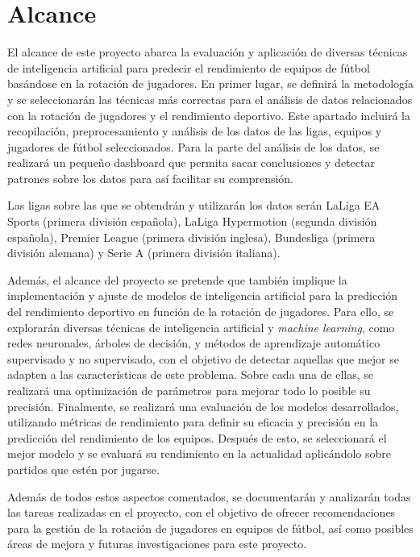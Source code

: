 \section{Alcance}
El alcance de este proyecto abarca la evaluación y aplicación de diversas técnicas de inteligencia artificial para predecir el rendimiento de equipos de fútbol basándose en la rotación de jugadores. En primer lugar, se definirá la metodología y se seleccionarán las técnicas más correctas para el análisis de datos relacionados con la rotación de jugadores y el rendimiento deportivo. Este apartado incluirá la recopilación, preprocesamiento y análisis de los datos de las ligas, equipos y jugadores de fútbol seleccionados. Para la parte del análisis de los datos, se realizará un pequeño dashboard que permita sacar conclusiones y detectar patrones sobre los datos para así facilitar su comprensión.

Las ligas sobre las que se obtendrán y utilizarán los datos serán LaLiga EA Sports (primera división española), LaLiga Hypermotion (segunda división española), Premier League (primera división inglesa), Bundesliga (primera división alemana) y Serie A (primera división italiana).

Además, el alcance del proyecto se pretende que también implique la implementación y ajuste de modelos de inteligencia artificial para la predicción del rendimiento deportivo en función de la rotación de jugadores. Para ello, se explorarán diversas técnicas de inteligencia artificial y \textit{machine learning}, como redes neuronales, árboles de decisión, y métodos de aprendizaje automático supervisado y no supervisado, con el objetivo de detectar aquellas que mejor se adapten a las características de este problema. Sobre cada una de ellas, se realizará una optimización de parámetros para mejorar todo lo posible su precisión.
Finalmente, se realizará una evaluación de los modelos desarrollados, utilizando métricas de rendimiento para definir su eficacia y precisión en la predicción del rendimiento de los equipos. Después de esto, se seleccionará el mejor modelo y se evaluará su rendimiento en la actualidad aplicándolo sobre partidos que estén por jugarse.

Además de todos estos aspectos comentados, se documentarán y analizarán todas las tareas realizadas en el proyecto, con el objetivo de ofrecer recomendaciones para la gestión de la rotación de jugadores en equipos de fútbol, así como posibles áreas de mejora y futuras investigaciones para este proyecto.


